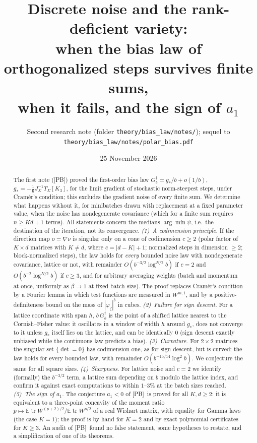 \documentclass[10pt]{article}
\title{\vspace{-2em}Discrete noise and the rank-deficient variety:\\
when the bias law of orthogonalized steps survives finite sums,\\ when it fails, and the sign of $a_1$}
\author{Second research note (folder \texttt{theory/bias\_law/notes/}); sequel to \texttt{theory/bias\_law/notes/polar\_bias.pdf}}
\date{25 November 2026}
\theoremstyle{definition}
\theoremstyle{remark}
\newcommand{\E}{\mathbb{E}}
\newcommand{\tr}{\operatorname{tr}}
\newcommand{\st}{\dagger}
\newcommand{\PB}{\textup{[PB]}}
\begin{document}
\maketitle

\begin{abstract}
The first note (\PB) proved the first-order bias law $G^\st_b=g_\ast/b+o(1/b)$,
$g_\ast=-\frac16J_\Sigma^{-1}T_\Sigma[K_3]$, for the limit gradient of stochastic norm-steepest steps, under Cram\'er's
condition; this excludes the gradient noise of every finite sum. We determine what happens without it, for minibatches drawn with replacement at a fixed parameter value, when the noise has nondegenerate covariance (which for a finite sum requires $n\ge Kd+1$ terms). All statements concern the medians $\arg\min\psi$, i.e.\ the destination of the iteration, not its convergence.
\emph{(1)~A codimension principle.} If the direction map $o=\nabla\nu$ is singular only on a cone of codimension
$c\ge2$ (polar factor of $K\times d$ matrices with $K\ne d$, where $c=|d-K|+1$; normalized steps in dimension $\ge2$;
block-normalized steps), the law holds for \emph{every} bounded noise law with nondegenerate covariance, lattice or not,
with remainder $O(b^{-3/2}\log^{N/2}b)$ if $c=2$ and $O(b^{-2}\log^{N/2}b)$ if $c\ge3$, and for arbitrary averaging weights
(batch and momentum at once, uniformly as $\beta\to1$ at fixed batch size). The proof replaces Cram\'er's condition by a
Fourier lemma in which test functions are measured in $W^{m,1}$, and by a positive-definiteness bound on the mass of
$|\varphi_\zeta|^b$ in cubes. \emph{(2)~Failure for sign descent.} For a lattice coordinate with span $h$, $b\,G^\st_b$
is the point of a shifted lattice nearest to the Cornish--Fisher value: it oscillates in a window of width $h$ around
$g_\ast$, does not converge to it unless $g_\ast$ itself lies on the lattice, and can be identically $0$ (sign descent exactly unbiased while the continuous law
predicts a bias). \emph{(3)~Curvature.} For $2\times2$ matrices the singular set $\{\det=0\}$ has codimension one, as for
sign descent, but is curved; the law holds for every bounded law, with remainder $O(b^{-15/14}\log^2b)$.
We conjecture the same for all square sizes. \emph{(4)~Sharpness.} For lattice noise and $c=2$ we identify (formally) the
$b^{-3/2}$ term, a lattice sum depending on $b$ modulo the lattice index, and confirm it against exact computations to
within $1$--$3\%$ at the batch sizes reached. \emph{(5)~The sign of $a_1$.} The conjecture $a_1<0$ of \PB\ is proved for all $K,d\ge2$: it is equivalent
to a three-point concavity of the moment ratio $p\mapsto\E\tr W^{(p+2)/2}/\E\tr W^{p/2}$ of a real Wishart matrix, with
equality for Gamma laws (the case $K=1$); the proof is by hand for $K=2$ and by exact polynomial certificates for
$K\ge3$. An audit of \PB\ found no false statement, some hypotheses to restate, and a simplification of one of its theorems.
\end{abstract}
\end{document}
